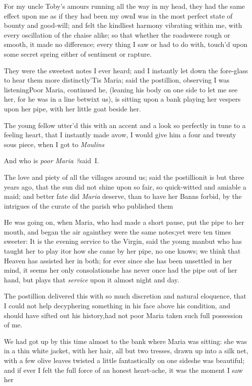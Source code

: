 \documentclass{article}
\begin{document}
\tsh For my uncle Toby’s amours running all the way in my head, they had the same
effect upon me as if they had been my own\tsh I was in the most perfect state of
bounty and good-will; and felt the kindliest harmony vibrating within me, with every
oscillation of the chaise alike; so that whether the roads\pb were rough or smooth,
it made no difference; every thing I saw or had to do with, touch’d upon some secret
spring either of sentiment or rapture.

\tsh They were the sweetest notes I ever heard; and I instantly let down the
fore-glass to hear them more distinctly\break\tsh ’Tis Maria; said the postillion,
observing I was listening\tsh Poor Maria, continued he, (leaning his body on one
side to let me see her, for he was in a line betwixt us), is sitting upon a bank
playing her vespers upon her pipe, with her little goat beside her.

The young fellow utter’d this with an accent and a look so
perfectly in tune to a feeling heart, that I instantly made a\pb vow,
I would give him a four and twenty sous piece, when I got to
\textit{Moulins}\tsh

\tsh And who is \textit{poor Maria ?}\break said~I.

The love and piety of all the villages around us; said the
postillion\tsh it is but three years ago, that the sun did
not shine upon so fair, so quick-witted and amiable a maid; and
better fate did \textit{Maria} deserve, than to have her Banns
forbid, by the intrigues of the curate of the parish who published
them\tsh

He was going on, when Maria, who had made a short pause,
put the pipe to her mouth, and began the air
again\pb\null\tsh they were the same notes;\tsh yet were
ten times sweeter: It is the evening service to the Virgin, said
the young man\break\tsh but who has taught her to play
it\tsk or how she came by her pipe, no one knows; we think that
Heaven has assisted her in both; for ever since she has been
unsettled in her mind, it seems her only
consolation\tsh she has never once had the pipe out of her
hand, but plays that \textit{service} upon it almost night and
day.

The postillion delivered this with so much discretion and
natural eloquence, that I could not help decyphering something in his face above his condition, and should
have sifted out his history,\pb had not poor Maria taken such
full possession of me.

We had got up by this time almost to the bank where Maria
was sitting: she was in a thin white jacket, with her hair, all but
two tresses, drawn up into a silk net, with a few olive leaves
twisted a little fantastically on one side\tsh she was
beautiful; and if ever I felt the full force of an honest
heart-ache, it was the moment I saw her\tsh
\end{document}
